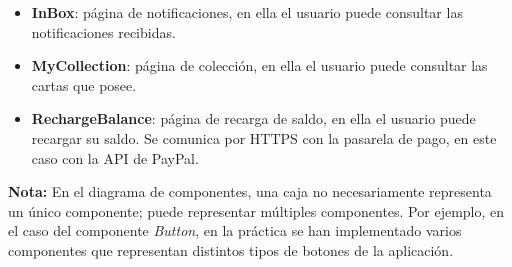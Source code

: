 \begin{itemize}
\begin{itemize}
\begin{itemize}
\begin{itemize}
                \item \textbf{InBox}: página de notificaciones, en ella el usuario puede consultar las notificaciones recibidas.
                \item \textbf{MyCollection}: página de colección, en ella el usuario puede consultar las cartas que posee.
                \item \textbf{RechargeBalance}: página de recarga de saldo, en ella el usuario puede recargar su saldo. Se comunica por HTTPS con la pasarela de pago, en este caso con la API de PayPal.
            \end{itemize}
        \end{itemize}
    \end{itemize}
\end{itemize}

\bigskip
\textbf{Nota:} En el diagrama de componentes, una caja no necesariamente representa un único componente; puede representar múltiples componentes. 
Por ejemplo, en el caso del componente \textit{Button}, en la práctica se han implementado varios componentes que representan distintos tipos de botones de la aplicación.
